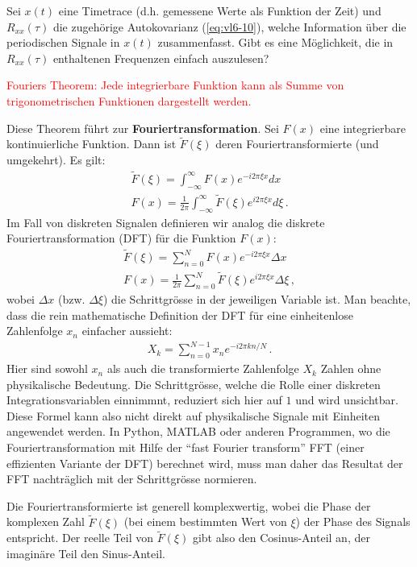 Sei $x(t)$ eine Timetrace (d.h. gemessene Werte als Funktion der Zeit) und $R_{xx} (\tau)$ die zugehörige Autokovarianz (\cref{eq:vl6-10}), welche Information über die periodischen Signale in $x(t)$ zusammenfasst. Gibt es eine Möglichkeit, die in $R_{xx} (\tau)$ enthaltenen Frequenzen einfach auszulesen?

\begin{center}
\textcolor{red}{Fouriers Theorem: Jede integrierbare Funktion kann als Summe von trigonometrischen Funktionen dargestellt werden.}
\end{center}

Diese Theorem führt zur \textbf{Fouriertransformation}. Sei $F(x)$ eine integrierbare kontinuierliche Funktion. Dann ist $\tilde{F}(\xi)$ deren Fouriertransformierte (und umgekehrt). Es gilt:
\begin{align}
\tilde{F}(\xi)= \int_{-\infty}^{\infty} F(x) e^{-i 2 \pi \xi x}dx \nonumber\\
{F}(x)= \frac{1}{2\pi}\int_{-\infty}^{\infty} \tilde{F}(\xi) e^{i 2 \pi \xi x}d\xi\,.
\label{eq:vl7-1a}
\end{align}
Im Fall von diskreten Signalen definieren wir analog die diskrete Fouriertransformation (DFT) für die Funktion $F(x)$:
\begin{align}
\tilde{F}(\xi)= \sum_{n=0}^{N} F(x) e^{-i 2 \pi \xi x} \Delta x \nonumber\\
{F}(x)= \frac{1}{2\pi}\sum_{n=0}^{N} \tilde{F}(\xi) e^{i 2 \pi \xi x}\Delta\xi\,,
\label{eq:vl7-1b}
\end{align}
wobei $\Delta x$ (bzw. $\Delta \xi$) die Schrittgrösse in der jeweiligen Variable ist. Man beachte, dass die rein mathematische Definition der DFT für eine einheitenlose Zahlenfolge $x_n$ einfacher aussieht:
\begin{align}
X_k = \sum_{n=0}^{N-1} x_n e^{-i 2 \pi k n/N}\,.
\label{eq:vl7-1c}
\end{align}
Hier sind sowohl $x_n$ als auch die transformierte Zahlenfolge $X_k$ Zahlen ohne physikalische Bedeutung. Die Schrittgrösse, welche die Rolle einer diskreten Integrationsvariablen einnimmnt, reduziert sich hier auf $1$ und wird unsichtbar. Diese Formel kann also nicht direkt auf physikalische Signale mit Einheiten angewendet werden. In Python, MATLAB oder anderen Programmen, wo die Fouriertransformation mit Hilfe der ``fast Fourier transform'' FFT (einer effizienten Variante der DFT) berechnet wird, muss man daher das Resultat der FFT nachträglich mit der Schrittgrösse normieren.

Die Fouriertransformierte ist generell komplexwertig, wobei die Phase der komplexen Zahl $\tilde{F}(\xi)$ (bei einem bestimmten Wert von $\xi$) der Phase des Signals entspricht. Der reelle Teil von $\tilde{F}(\xi)$ gibt also den Cosinus-Anteil an, der imaginäre Teil den Sinus-Anteil.

